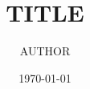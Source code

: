 \documentclass[12pt]{article}
\title{TITLE}
\author{AUTHOR}
\date{\today}
\begin{document}
\maketitle

\begin{abstract}

\end{abstract}










\end{document}

